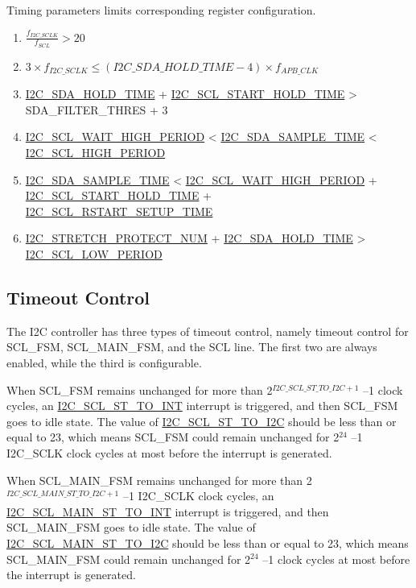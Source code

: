 \documentclass[main\_\_EN.tex]{subfiles}
\begin{document}
Timing parameters limits corresponding register configuration.
\begin{enumerate}
\item $\frac{f_{I2C\_SCLK}}{f_{SCL}}  > 20$
\item $3 \times f_{I2C\_SCLK} \leq (\hyperref[fielddesc:I2CSDAHOLDTIME]{I2C\_SDA\_HOLD\_TIME}-4) \times f_{APB\_CLK}$
\item \hyperref[fielddesc:I2CSDAHOLDTIME]{I2C\_SDA\_HOLD\_TIME} + \hyperref[fielddesc:I2CSCLSTARTHOLDTIME]{I2C\_SCL\_START\_HOLD\_TIME} > SDA\_FILTER\_THRES + 3
\item \hyperref[fielddesc:I2CSCLWAITHIGHPERIOD]{I2C\_SCL\_WAIT\_HIGH\_PERIOD} < \hyperref[fielddesc:I2CSDASAMPLETIME]{I2C\_SDA\_SAMPLE\_TIME} < \hyperref[fielddesc:I2CSCLHIGHPERIOD]{I2C\_SCL\_HIGH\_PERIOD}
\item \hyperref[fielddesc:I2CSDASAMPLETIME]{I2C\_SDA\_SAMPLE\_TIME} < \hyperref[fielddesc:I2CSCLWAITHIGHPERIOD]{I2C\_SCL\_WAIT\_HIGH\_PERIOD} + \hyperref[fielddesc:I2CSCLSTARTHOLDTIME]{I2C\_SCL\_START\_HOLD\_TIME} + \\\hyperref[fielddesc:I2CSCLRSTARTSETUPTIME]{I2C\_SCL\_RSTART\_SETUP\_TIME}
\item \hyperref[fielddesc:I2CSTRETCHPROTECTNUM]{I2C\_STRETCH\_PROTECT\_NUM} + \hyperref[fielddesc:I2CSDAHOLDTIME]{I2C\_SDA\_HOLD\_TIME} > \hyperref[fielddesc:I2CSCLLOWPERIOD]{I2C\_SCL\_LOW\_PERIOD}
\end{enumerate}



\subsection{Timeout Control}
The I2C controller has three types of timeout control, namely timeout control for SCL\_FSM, SCL\_MAIN\_FSM, and the SCL line. The first two are always enabled, while the third is configurable.

When SCL\_FSM remains unchanged for more than 2$^{\hyperref[fielddesc:I2CSCLSTTOI2C]{I2C\_SCL\_ST\_TO\_I2C}+1}$ –1 clock cycles, an \hyperref[int:i2c-scl-fsm]{I2C\_SCL\_ST\_TO\_INT} interrupt is triggered, and then SCL\_FSM goes to idle state. The value of \hyperref[fielddesc:I2CSCLSTTOI2C]{I2C\_SCL\_ST\_TO\_I2C} should be less than or equal to 23, which means SCL\_FSM could remain unchanged for 2$^{24}$ –1 I2C\_SCLK clock cycles at most before the interrupt is generated.

When SCL\_MAIN\_FSM remains unchanged for more than 2$^{ \hyperref[fielddesc:I2CSCLMAINSTTOI2C]{I2C\_SCL\_MAIN\_ST\_TO\_I2C}+1}$ –1 I2C\_SCLK clock cycles, an \hyperref[int:i2c-scl-main-fsm]{I2C\_SCL\_MAIN\_ST\_TO\_INT} interrupt is triggered, and then SCL\_MAIN\_FSM goes to idle state. The value of \hyperref[fielddesc:I2CSCLMAINSTTOI2C]{I2C\_SCL\_MAIN\_ST\_TO\_I2C} should be less than or equal to 23, which means SCL\_MAIN\_FSM could remain unchanged for 2$^{24}$ –1 clock cycles at most before the interrupt is generated.
\end{document}

